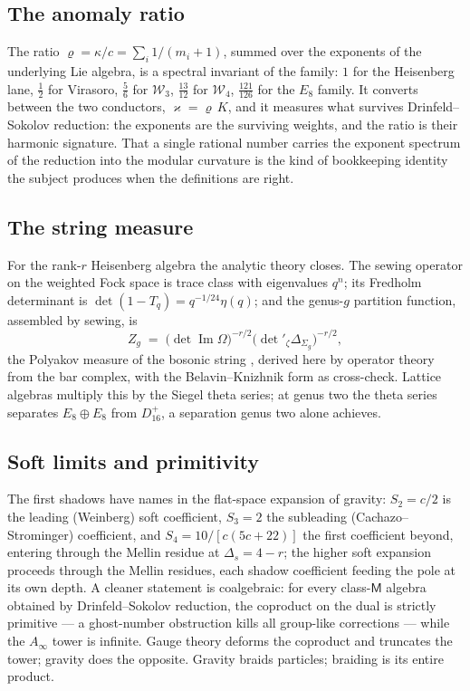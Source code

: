 \documentclass[11pt]{amsart}
\numberwithin{equation}{section}
\theoremstyle{plain}
\theoremstyle{definition}
\theoremstyle{remark}
\newcommand{\cW}{\mathcal{W}}
\begin{document}
\subsection{The anomaly ratio}

The ratio $\varrho=\kappa/c=\sum_i 1/(m_i+1)$, summed over the
exponents of the underlying Lie algebra, is a spectral invariant of
the family: $1$ for the Heisenberg lane, $\tfrac12$ for Virasoro,
$\tfrac56$ for $\cW_3$, $\tfrac{13}{12}$ for $\cW_4$,
$\tfrac{121}{126}$ for the $E_8$ family. It converts between the two
conductors, $\varkappa=\varrho\,K$, and it measures what survives
Drinfeld--Sokolov reduction: the exponents are the surviving weights,
and the ratio is their harmonic signature. That a single rational
number carries the exponent spectrum of the reduction into the
modular curvature is the kind of bookkeeping identity the subject
produces when the definitions are right.

\subsection{The string measure}

For the rank-$r$ Heisenberg algebra the analytic theory closes. The
sewing operator on the weighted Fock space is trace class with
eigenvalues $q^{n}$; its Fredholm determinant is
$\det(1-T_q)=q^{-1/24}\eta(q)$; and the genus-$g$ partition function,
assembled by sewing, is
\begin{equation}
Z_g\;=\;\bigl(\det\operatorname{Im}\Omega\bigr)^{-r/2}
\bigl({\det}'_{\zeta}\Delta_{\Sigma_g}\bigr)^{-r/2},
\end{equation}
the Polyakov measure of the bosonic string \cite{DP}, derived here by
operator theory from the bar complex, with the Belavin--Knizhnik form
as cross-check. Lattice algebras multiply this by the Siegel theta
series; at genus two the theta series separates $E_8\oplus E_8$ from
$D_{16}^{+}$, a separation genus two alone achieves.

\subsection{Soft limits and primitivity}

The first shadows have names in the flat-space expansion of gravity:
$S_2=c/2$ is the leading (Weinberg) soft coefficient, $S_3=2$ the
subleading (Cachazo--Strominger) coefficient, and
$S_4=10/[c(5c+22)]$ the first coefficient beyond, entering through the
Mellin residue at $\Delta_s=4-r$; the higher soft expansion proceeds
through the Mellin residues, each shadow coefficient feeding the pole
at its own depth. A cleaner
statement is coalgebraic: for every class-$\mathsf{M}$ algebra obtained
by Drinfeld--Sokolov reduction, the coproduct on the dual is strictly
primitive --- a ghost-number obstruction kills all group-like
corrections --- while the $A_\infty$ tower is infinite. Gauge theory
deforms the coproduct and truncates the tower; gravity does the
opposite. Gravity braids particles; braiding is its entire product.
\end{document}
